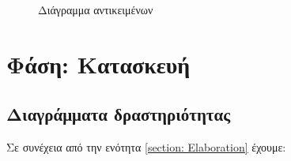 \documentclass{assignment}
\begin{document}
\begin{figure}
\begin{center}
\caption{Διάγραμμα αντικειμένων} 
\label{fig:object_diagramm}
\end{center}
\end{figure}




\section{Φάση: Κατασκευή}



\subsection{Διαγράμματα δραστηριότητας}

Σε συνέχεια από την ενότητα \ref{section: Elaboration} έχουμε:
\end{document}
